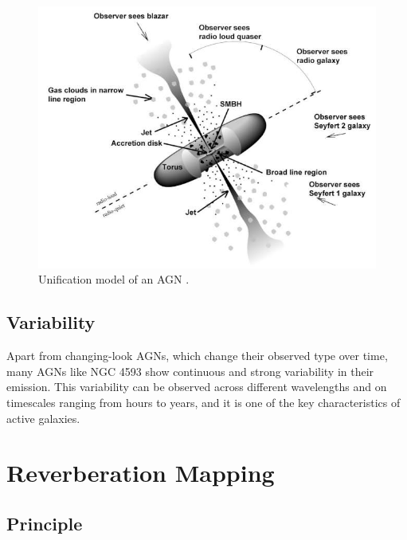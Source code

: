 \begin{figure}[!ht]
	\centering
	\includegraphics[width=\textwidth]{pictures/Chapter2/AGN_unified_model.jpg}
	\caption{Unification model of an AGN \parencite{fermi2025figure1}.}
	\label{fig:agn_sed}
\end{figure}




\subsection{Variability}
\label{sec:variability}
Apart from changing-look AGNs, which change their observed type over time, many AGNs like NGC 4593 show continuous and strong variability in their emission. This variability can be observed across different wavelengths and on timescales ranging from hours to years, and it is one of the key characteristics of active galaxies.

\section{Reverberation Mapping}
\label{sec:reverberation_mapping}


\subsection{Principle}
\label{subsec:rm_principle}



